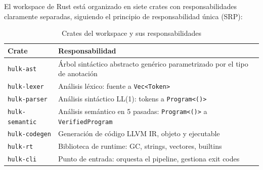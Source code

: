 \documentclass[12pt, a4paper]{article}
\begin{document}
\begin{center}
\shorthandoff{>}
\shorthandon{>}
\end{center}

El workspace de Rust est\'{a} organizado en siete crates con responsabilidades
claramente separadas, siguiendo el principio de responsabilidad \'{u}nica (SRP):

\begin{table}[h!]
\centering
\caption{Crates del workspace y sus responsabilidades}
\label{tab:crates}
\begin{tabularx}{\textwidth}{@{}lX@{}}
\toprule
\textbf{Crate} & \textbf{Responsabilidad} \\
\midrule
\texttt{hulk-ast}      & \'{A}rbol sint\'{a}ctico abstracto gen\'{e}rico parametrizado por el tipo de anotaci\'{o}n \\
\texttt{hulk-lexer}    & An\'{a}lisis l\'{e}xico: fuente a \texttt{Vec<Token>} \\
\texttt{hulk-parser}   & An\'{a}lisis sint\'{a}ctico LL(1): tokens a \texttt{Program<()>} \\
\texttt{hulk-semantic} & An\'{a}lisis sem\'{a}ntico en 5 pasadas: \texttt{Program<()>} a \texttt{VerifiedProgram} \\
\texttt{hulk-codegen}  & Generaci\'{o}n de c\'{o}digo LLVM IR, objeto y ejecutable \\
\texttt{hulk-rt}       & Biblioteca de runtime: GC, strings, vectores, builtins \\
\texttt{hulk-cli}      & Punto de entrada: orquesta el pipeline, gestiona exit codes \\
\bottomrule
\end{tabularx}
\end{table}
\end{document}
